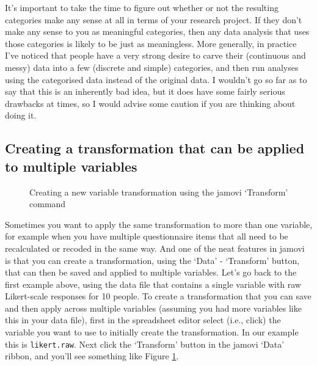 It's important to take the time to figure out whether or not the resulting categories make any sense at all in terms of your research project. If they don't make any sense to you as meaningful categories, then any data analysis that uses those categories is likely to be just as meaningless. More generally, in practice I've noticed that people have a very strong desire to carve their (continuous and messy) data into a few (discrete and simple) categories, and then run analyses using the categorised data instead of the original data. I wouldn't go so far as to say that this is an inherently bad idea, but it does have some fairly serious drawbacks at times, so I would advise some caution if you are thinking about doing it. 


\subsection{Creating a transformation that can be applied to multiple variables}

\begin{figure}[p]
\begin{center}
\caption{Creating a new variable transformation using the jamovi `Transform' command}
\label{fig:transform1}
\end{center}
\end{figure}

Sometimes you want to apply the same transformation to more than one variable, for example when you have multiple questionnaire items that all need to be recalculated or recoded in the same way. And one of the neat features in jamovi is that you can create a transformation, using the `Data' - `Transform' button, that can then be saved and  applied to multiple variables. Let's go back to the first example above, using the data file  that contains a single variable with raw Likert-scale responses for 10 people. To create a transformation that you can save and then apply across multiple variables (assuming you had more variables like this in your data file), first in the spreadsheet editor select (i.e., click) the variable you want to use to initially create the transformation. In our example this is \texttt{likert.raw}. Next click the `Transform' button in the jamovi `Data' ribbon, and you'll see something like Figure \ref{fig:transform1}. 

